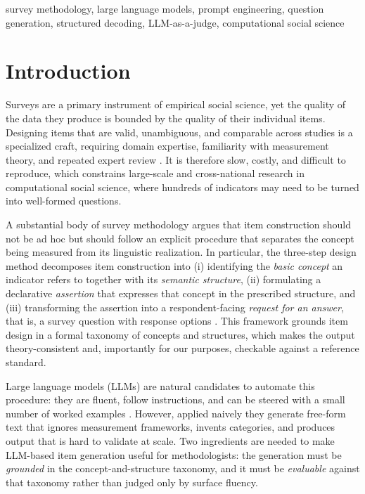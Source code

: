 \documentclass[onecolumn, 11pt]{IEEEtran}
\begin{document}
\begin{IEEEkeywords}
survey methodology, large language models, prompt engineering, question generation, structured decoding, LLM-as-a-judge, computational social science
\end{IEEEkeywords}

\tableofcontents

\section{Introduction}
Surveys are a primary instrument of empirical social science, yet the quality of the data they produce is bounded by the quality of their individual items. Designing items that are valid, unambiguous, and comparable across studies is a specialized craft, requiring domain expertise, familiarity with measurement theory, and repeated expert review \cite{groves2009survey}. It is therefore slow, costly, and difficult to reproduce, which constrains large-scale and cross-national research in computational social science, where hundreds of indicators may need to be turned into well-formed questions.

A substantial body of survey methodology argues that item construction should not be ad hoc but should follow an explicit procedure that separates the concept being measured from its linguistic realization. In particular, the three-step design method decomposes item construction into (i) identifying the \emph{basic concept} an indicator refers to together with its \emph{semantic structure}, (ii) formulating a declarative \emph{assertion} that expresses that concept in the prescribed structure, and (iii) transforming the assertion into a respondent-facing \emph{request for an answer}, that is, a survey question with response options \cite{saris2014design}. This framework grounds item design in a formal taxonomy of concepts and structures, which makes the output theory-consistent and, importantly for our purposes, checkable against a reference standard.

Large language models (LLMs) are natural candidates to automate this procedure: they are fluent, follow instructions, and can be steered with a small number of worked examples \cite{brown2020language, liu2023prompt}. However, applied naively they generate free-form text that ignores measurement frameworks, invents categories, and produces output that is hard to validate at scale. Two ingredients are needed to make LLM-based item generation useful for methodologists: the generation must be \emph{grounded} in the concept-and-structure taxonomy, and it must be \emph{evaluable} against that taxonomy rather than judged only by surface fluency.
\end{document}
